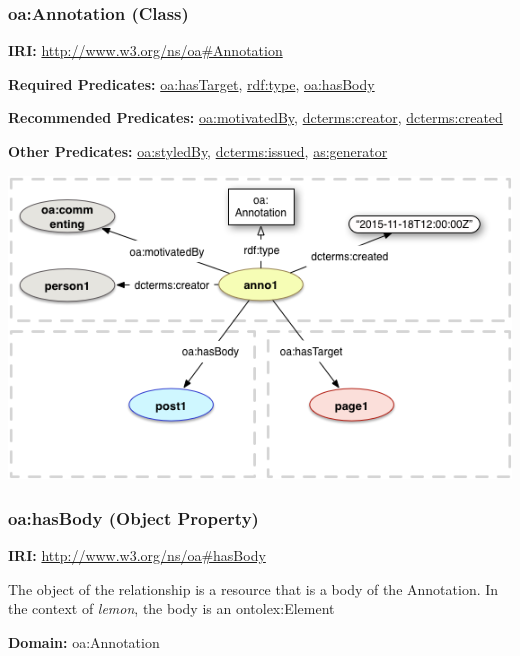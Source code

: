 \documentclass[a4paper]{article}
\newcommand\textstyleEmphasis[1]{\textit{#1}}
\newcommand\textstyleInternetlink[1]{\textcolor[rgb]{0.0,0.0,0.5019608}{#1}}
\newcommand\textstyleStrongEmphasis[1]{\textbf{#1}}
\newcommand\textstyleTeletype[1]{\textrm{#1}}
\begin{document}
\subsubsection[oa:Annotation (Class)]{oa:Annotation (Class)}
\textstyleStrongEmphasis{IRI:} \url{http://www.w3.org/ns/oa#Annotation}

\textstyleStrongEmphasis{Required Predicates:} \hyperlink{hastarget}{\textstyleInternetlink{oa:hasTarget}}, \hyperlink{rdftype}{\textstyleInternetlink{rdf:type}}, \hyperlink{hasbody}{\textstyleInternetlink{oa:hasBody}}

\textstyleStrongEmphasis{Recommended Predicates:} \hyperlink{motivatedby}{\textstyleInternetlink{oa:motivatedBy}}, \hyperlink{dctermscreator}{\textstyleInternetlink{dcterms:creator}}, \hyperlink{dctermscreated}{\textstyleInternetlink{dcterms:created}}

\textstyleStrongEmphasis{Other Predicates:} \hyperlink{styledby}{\textstyleInternetlink{oa:styledBy}}, \hyperlink{dctermsissued}{\textstyleInternetlink{dcterms:issued}}, \hyperlink{asgenerator}{\textstyleInternetlink{as:generator}} 

 \includegraphics{index-img/index-img005.png}  

\subsubsection[oa:hasBody (Object Property)]{oa:hasBody (Object Property)}
\textstyleStrongEmphasis{IRI:} \url{http://www.w3.org/ns/oa#hasBody}

The object of the relationship is a resource that is a body of the Annotation. In the context of \textstyleEmphasis{lemon}, the body is an \textstyleTeletype{ontolex:Element}

\textstyleStrongEmphasis{Domain:} oa:Annotation
\end{document}
